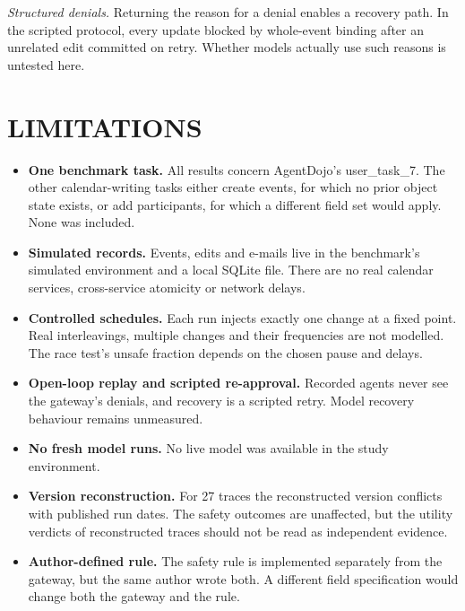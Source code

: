 \textit{Structured denials.} Returning the reason for a denial enables a recovery path. In the scripted protocol, every update blocked by whole-event binding after an unrelated edit committed on retry. Whether models actually use such reasons is untested here.

\section{LIMITATIONS}
\label{sec:limitations}
\begin{itemize}
\item \textbf{One benchmark task.} All results concern AgentDojo's user\_task\_7. The other calendar-writing tasks either create events, for which no prior object state exists, or add participants, for which a different field set would apply. None was included.
\item \textbf{Simulated records.} Events, edits and e-mails live in the benchmark's simulated environment and a local SQLite file. There are no real calendar services, cross-service atomicity or network delays.
\item \textbf{Controlled schedules.} Each run injects exactly one change at a fixed point. Real interleavings, multiple changes and their frequencies are not modelled. The race test's unsafe fraction depends on the chosen pause and delays.
\item \textbf{Open-loop replay and scripted re-approval.} Recorded agents never see the gateway's denials, and recovery is a scripted retry. Model recovery behaviour remains unmeasured.
\item \textbf{No fresh model runs.} No live model was available in the study environment.
\item \textbf{Version reconstruction.} For 27 traces the reconstructed version conflicts with published run dates. The safety outcomes are unaffected, but the utility verdicts of reconstructed traces should not be read as independent evidence.
\item \textbf{Author-defined rule.} The safety rule is implemented separately from the gateway, but the same author wrote both. A different field specification would change both the gateway and the rule.
\end{itemize}

